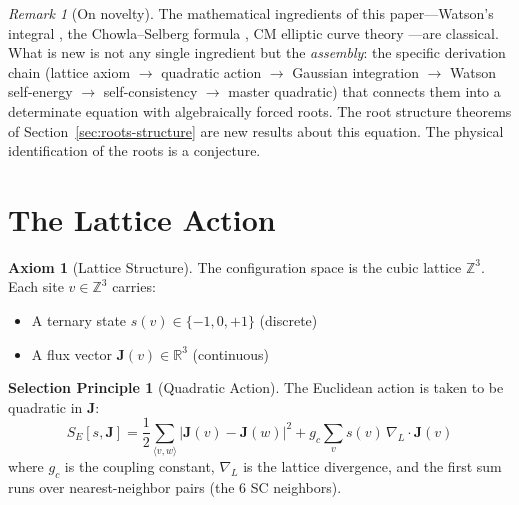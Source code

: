 \documentclass[12pt]{article}
\theoremstyle{definition}
\newtheorem{axiom}[theorem]{Axiom}
\newtheorem{selection}[theorem]{Selection Principle}
\theoremstyle{remark}
\newtheorem{remark}[theorem]{Remark}
\begin{document}
\begin{remark}[On novelty]
The mathematical ingredients of this paper---Watson's integral \cite{watson1939}, the Chowla--Selberg formula \cite{chowla-selberg}, CM elliptic curve theory \cite{silverman}---are classical. What is new is not any single ingredient but the \emph{assembly}: the specific derivation chain (lattice axiom $\to$ quadratic action $\to$ Gaussian integration $\to$ Watson self-energy $\to$ self-consistency $\to$ master quadratic) that connects them into a determinate equation with algebraically forced roots. The root structure theorems of Section~\ref{sec:roots-structure} are new results about this equation. The physical identification of the roots is a conjecture.
\end{remark}

\section{The Lattice Action}
\label{sec:action}

\begin{axiom}[Lattice Structure]
\label{ax:lattice}
The configuration space is the cubic lattice $\mathbb{Z}^3$. Each site $v \in \mathbb{Z}^3$ carries:
\begin{itemize}[nosep]
    \item A ternary state $s(v) \in \{-1, 0, +1\}$ (discrete)
    \item A flux vector $\mathbf{J}(v) \in \mathbb{R}^3$ (continuous)
\end{itemize}
\end{axiom}

\begin{selection}[Quadratic Action]
\label{sel:quadratic}
The Euclidean action is taken to be quadratic in $\mathbf{J}$:
\begin{equation}
    S_E[s, \mathbf{J}] = \frac{1}{2}\sum_{\langle v, w \rangle} |\mathbf{J}(v) - \mathbf{J}(w)|^2 + g_c \sum_v s(v)\,\nabla_L \cdot \mathbf{J}(v)
    \label{eq:action}
\end{equation}
where $g_c$ is the coupling constant, $\nabla_L$ is the lattice divergence, and the first sum runs over nearest-neighbor pairs (the 6 SC neighbors).
\end{selection}
\end{document}
